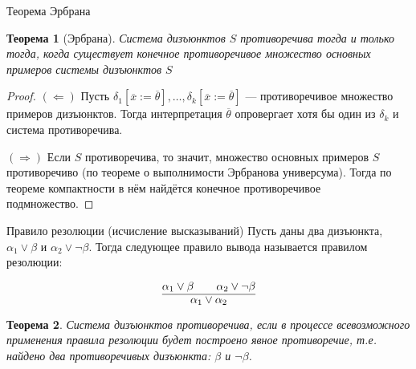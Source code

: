 \documentclass[aspectratio=169]{beamer}
\newtheorem{thm}{Теорема}[section]
\begin{document}
\begin{frame}{Теорема Эрбрана}
\begin{thm}[Эрбрана]Система дизъюнктов $S$ противоречива тогда и только тогда, когда существует
конечное противоречивое множество основных примеров системы дизъюнктов $S$\end{thm}
\begin{proof}$(\Leftarrow)$ 
Пусть $\delta_1[\overline{x} := \overline{\theta}],\dots,\delta_k[\overline{x} := \overline{\theta}]$ 
--- противоречивое множество примеров дизъюнктов. Тогда интерпретация $\overline{\theta}$
опровергает хотя бы один из $\delta_k$ и система противоречива.

$(\Rightarrow)$ Если $S$ противоречива, то значит, множество основных примеров $S$
противоречиво (по теореме о выполнимости Эрбранова универсума). Тогда по теореме компактности
в нём найдётся конечное противоречивое подмножество.
\end{proof}
\end{frame}

\begin{frame}{Правило резолюции (исчисление высказываний)}
Пусть даны два дизъюнкта, $\alpha_1 \vee \beta$ и $\alpha_2 \vee \neg \beta$.
Тогда следующее правило вывода называется правилом резолюции:

$$\infer{\alpha_1\vee \alpha_2}{\alpha_1\vee \beta\quad\quad \alpha_2\vee\neg \beta}$$

\begin{thm}Система дизъюнктов противоречива, если в процессе всевозможного применения
правила резолюции будет построено явное противоречие, 
т.е. найдено два противоречивых дизъюнкта: $\beta$ и $\neg\beta$.
\end{thm}
\end{frame}
\end{document}
